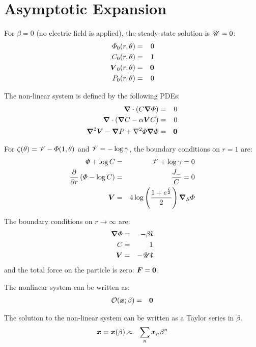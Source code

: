 \section{Asymptotic Expansion}

For $\beta = 0$ (no electric field is applied), the steady-state solution is $\mathscr{U} = 0$:
\begin{eqnarray}
\varPhi_0(r,\theta) &=& 0 \\
C_0(r,\theta) &=& 1 \\
\boldsymbol{V}_0(r,\theta) &=& \boldsymbol{0} \\
P_0(r,\theta) &=& 0
\end{eqnarray}

The non-linear system is defined by the following PDEs:
\label{PDEs}
\begin{eqnarray}
\boldsymbol{\nabla} \cdot \left(C \boldsymbol{\nabla} \varPhi\right) &=& 0 \\
\boldsymbol{\nabla} \cdot \left(\boldsymbol{\nabla} C - \alpha \boldsymbol{V} C\right) &=& 0 \\
\boldsymbol{\nabla}^2 \boldsymbol{V} - \boldsymbol{\nabla} P + \nabla^2 \varPhi \boldsymbol{\nabla} \varPhi &=& \boldsymbol{0}
\end{eqnarray}

For $\zeta(\theta) = \mathscr{V} - \varPhi(1, \theta)$ and 
$\mathscr{V} = -\log \gamma$, the boundary conditions on $r = 1$ are:
\begin{eqnarray}
\varPhi + \log C &=& \mathscr{V} + \log \gamma = 0 \\
\frac{\partial }{\partial r}\left(\varPhi - \log C\right) &=& \frac{J_-}{C} = 0 \\
\boldsymbol{V} &=& 4\log\left(\frac{1 + e^\frac{\zeta}{2}}{2}\right) \boldsymbol{\nabla}_S \varPhi
\end{eqnarray}

The boundary conditions on $r \rightarrow \infty$ are:
\begin{eqnarray}
\boldsymbol{\nabla} \varPhi &=& -\beta \boldsymbol{\hat{\imath}} \\
C &=& 1 \\
\boldsymbol{V} &=& -\mathscr{U} \boldsymbol{\hat{\imath}}
\end{eqnarray}
and the total force on the particle is zero: $\boldsymbol{F} = \boldsymbol{0}$.

The nonlinear system can be written as: 
\begin{eqnarray}
\mathcal{O}(\boldsymbol{x};\beta) &=& \boldsymbol{0}
\end{eqnarray}

The solution to the non-linear system can be written as a Taylor series in $\beta$.
\begin{eqnarray}
\boldsymbol{x} = \boldsymbol{x}(\beta) &\approx& \sum_n \boldsymbol{x}_n \beta^n
\end{eqnarray}

